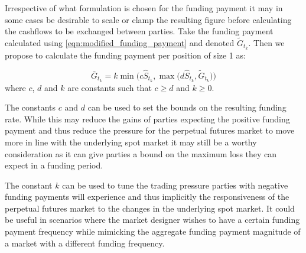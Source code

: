 \documentclass[10pt]{article}
\begin{document}
Irrespective of what formulation is chosen for the funding payment it may in some cases be desirable to scale or clamp the resulting figure before calculating the cashflows to be exchanged between parties. Take the funding payment calculated using \eqref{eqn:modified_funding_payment} and denoted $\tilde G_{t_k}$. Then we propose to calculate the funding payment per position of size 1 as:

$$
\bar G_{t_k} = k \min \Big (c\hat S_{t_k},\max \big(d\hat S_{t_k}, \tilde G_{t_k} \big ) \Big )
$$
where $c$, $d$ and $k$ are constants such that $ c \ge d $ and $k\geq 0$.

The constants $c$ and $d$ can be used to set the bounds on the resulting funding rate. While this may reduce the gains of parties expecting the positive funding payment and thus reduce the pressure for the perpetual futures market to move more in line with the underlying spot market it may still be a worthy consideration as it can give parties a bound on the maximum loss they can expect in a funding period. 

The constant $k$ can be used to tune the trading pressure parties with negative funding payments will experience and thus implicitly the responsiveness of the perpetual futures market to the changes in the underlying spot market. It could be useful in scenarios where the market designer wishes to have a certain funding payment frequency while mimicking the aggregate funding payment magnitude of a market with a different funding frequency.
\end{document}
